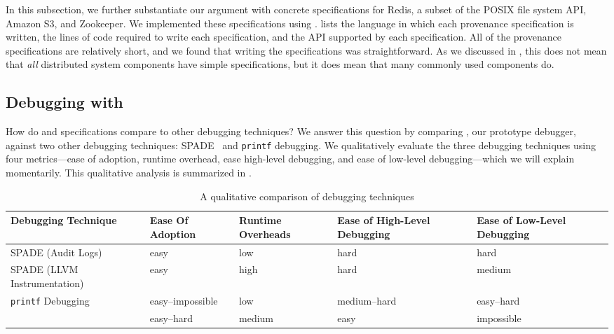 In this subsection, we further substantiate our argument with concrete
\watprovenance{} specifications for Redis, a subset of the POSIX file system
API, Amazon S3, and Zookeeper. We implemented these \watprovenance{}
specifications using \fluent{}.  lists the language in
which each provenance specification is written, the lines of code required to
write each specification, and the API supported by each specification. All of
the provenance specifications are relatively short, and we found that writing
the specifications was straightforward. As we discussed in
, this does not mean that \emph{all}
distributed system components have simple \watprovenance{} specifications, but
it does mean that many commonly used components do.

\subsection{Debugging with \WatProvenance}
How do \watprovenance{} and \watprovenance{} specifications compare to other
debugging techniques? We answer this question by comparing \fluent{}, our
prototype \watprovenance{} debugger, against two other debugging techniques:
SPADE~\cite{gehani2012spade} and \texttt{printf} debugging. We qualitatively
evaluate the three debugging techniques using four metrics---ease of adoption,
runtime overhead, ease high-level debugging, and ease of low-level
debugging---which we will explain momentarily. This qualitative analysis is
summarized in .

\begin{table*}[t]
  \caption{A qualitative comparison of debugging techniques}
  \begin{tabular}{lllp{3cm}p{3cm}}
    \toprule
    Debugging Technique          & Ease Of Adoption & Runtime Overheads & Ease of High-Level Debugging & Ease of Low-Level Debugging \\\midrule
    SPADE (Audit Logs)           & easy             & low               & hard                         & hard \\
    SPADE (LLVM Instrumentation) & easy             & high              & hard                         & medium \\
    \texttt{printf} Debugging    & easy--impossible & low               & medium--hard                 & easy--hard \\
    \fluent{}                    & easy--hard       & medium            & easy                         & impossible \\
    \bottomrule
  \end{tabular}
\end{table*}

